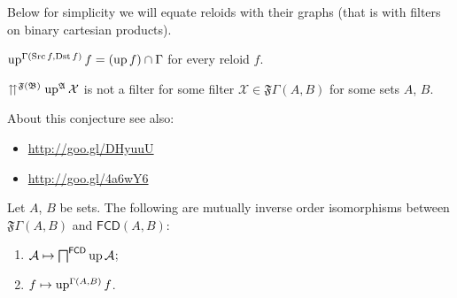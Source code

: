 Below for simplicity we will equate reloids with their graphs (that
is with filters on binary cartesian products).
\begin{obvious}
$\operatorname{up}^{\Gamma(\operatorname{Src} f,\operatorname{Dst} f)}f=(\operatorname{up} f)\cap\Gamma$ for every reloid
$f$.\end{obvious}
\begin{conjecture}
$\upuparrows^{\mathfrak{F}(\mathfrak{B})}\operatorname{up}^{\mathfrak{A}}\mathcal{X}$
is not a filter for some filter $\mathcal{X}\in\mathfrak{F}\Gamma(A,B)$
for some sets $A$, $B$.\end{conjecture}
\begin{rem}
About this conjecture see also: 
\begin{itemize}
\item \href{http://goo.gl/DHyuuU}{http://goo.gl/DHyuuU}
\item \href{http://goo.gl/4a6wY6}{http://goo.gl/4a6wY6}
\end{itemize}
\end{rem}
\begin{lem}
\label{faf-bij}Let $A$, $B$ be sets. The following are mutually
inverse order isomorphisms between $\mathfrak{F}\Gamma(A,B)$ and
$\mathsf{FCD}(A,B)$:
\begin{enumerate}
\item $\mathcal{A}\mapsto\bigsqcap^{\mathsf{FCD}}\operatorname{up}\mathcal{A}$;
\item $f\mapsto\operatorname{up}^{\Gamma(A,B)}f$.
\end{enumerate}
\end{lem}
